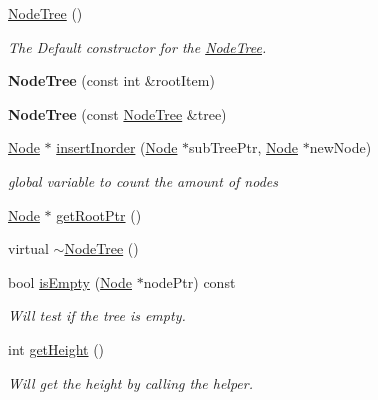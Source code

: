 \begin{DoxyCompactItemize}
\item 
\mbox{\label{class_node_tree_aaffe7d72c1e5c56881854487370281a8}} 
\mbox{\hyperlink{class_node_tree_aaffe7d72c1e5c56881854487370281a8}{Node\+Tree}} ()
\begin{DoxyCompactList}\small\item\em The Default constructor for the \mbox{\hyperlink{class_node_tree}{Node\+Tree}}. \end{DoxyCompactList}\item 
\mbox{\label{class_node_tree_a6cb351a862dce80510ac48d145de2e9c}} 
{\bfseries Node\+Tree} (const int \&root\+Item)
\item 
\mbox{\label{class_node_tree_a801678afd7b236bc75687a776e979f80}} 
{\bfseries Node\+Tree} (const \mbox{\hyperlink{class_node_tree}{Node\+Tree}} \&tree)
\item 
\mbox{\hyperlink{class_node}{Node}} $\ast$ \mbox{\hyperlink{class_node_tree_ae6d1c0d70fc02fea199e9e7a81491d83}{insert\+Inorder}} (\mbox{\hyperlink{class_node}{Node}} $\ast$sub\+Tree\+Ptr, \mbox{\hyperlink{class_node}{Node}} $\ast$new\+Node)
\begin{DoxyCompactList}\small\item\em global variable to count the amount of nodes \end{DoxyCompactList}\item 
\mbox{\hyperlink{class_node}{Node}} $\ast$ \mbox{\hyperlink{class_node_tree_a5581b1e229d7310960e826a14e34f560}{get\+Root\+Ptr}} ()
\item 
virtual \mbox{\hyperlink{class_node_tree_a3ad091290982424bcc0750da7133e411}{$\sim$\+Node\+Tree}} ()
\item 
bool \mbox{\hyperlink{class_node_tree_a484735008677b458037b1ce114d12f1a}{is\+Empty}} (\mbox{\hyperlink{class_node}{Node}} $\ast$node\+Ptr) const
\begin{DoxyCompactList}\small\item\em Will test if the tree is empty. \end{DoxyCompactList}\item 
int \mbox{\hyperlink{class_node_tree_a711fa23ec5715b82c1a6dee780fde087}{get\+Height}} ()
\begin{DoxyCompactList}\small\item\em Will get the height by calling the helper. \end{DoxyCompactList}\item 

\end{DoxyCompactItemize}
